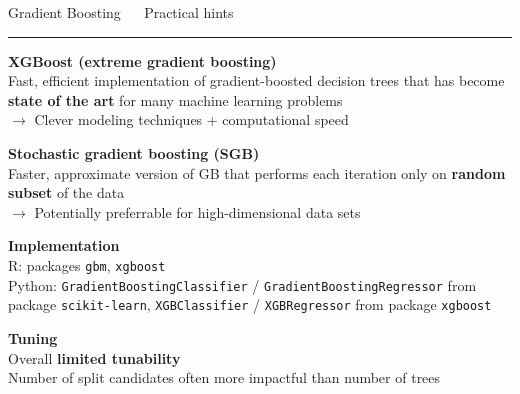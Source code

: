 \documentclass[11pt,compress,t,notes=noshow, xcolor=table]{beamer}
\begin{document}

\LARGE
\begin{frame}{\textcolor{gray!80}{Gradient Boosting} ~~ Practical hints}
\normalsize
\vspace{-0.5cm}
\noindent \textcolor{gray!80}{\rule{\textwidth}{1pt}}

\vspace{0.3cm}

\footnotesize

\textbf{\textcolor{gray!80}{XGBoost (extreme gradient boosting)}} \\
\smallskip
Fast, efficient implementation of gradient-boosted decision trees that has
become \textbf{state of the art} for many machine learning problems \\
$\rightarrow$ Clever modeling techniques + computational speed \\

\lz

\textbf{\textcolor{gray!80}{Stochastic gradient boosting (SGB)}} \\
\smallskip
Faster, approximate version of GB that performs each iteration only on 
\textbf{random subset} of the data \\
$\rightarrow$ Potentially preferrable for high-dimensional data sets 

\lz

\textbf{\textcolor{gray!80}{Implementation}} \\
\smallskip
R: packages \texttt{gbm}, \texttt{xgboost}\\
Python: \texttt{GradientBoostingClassifier} / \texttt{GradientBoostingRegressor} 
from package \texttt{scikit-learn}, \texttt{XGBClassifier} / 
\texttt{XGBRegressor} from package \texttt{xgboost}
\lz

\textbf{\textcolor{gray!80}{Tuning}} \\
\smallskip
Overall \textbf{limited tunability} \\
Number of split candidates often more impactful than number of trees

\end{frame}





\end{document}
